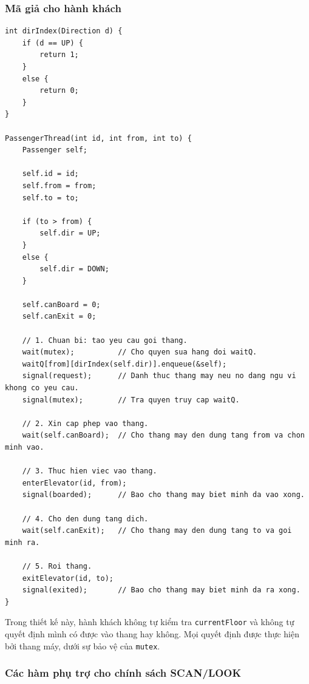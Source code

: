 \subsubsection*{Mã giả cho hành khách}

\begin{lstlisting}
int dirIndex(Direction d) {
    if (d == UP) {
        return 1;
    }
    else {
        return 0;
    }
}

PassengerThread(int id, int from, int to) {
    Passenger self;

    self.id = id;
    self.from = from;
    self.to = to;

    if (to > from) {
        self.dir = UP;
    }
    else {
        self.dir = DOWN;
    }

    self.canBoard = 0;
    self.canExit = 0;

    // 1. Chuan bi: tao yeu cau goi thang.
    wait(mutex);          // Cho quyen sua hang doi waitQ.
    waitQ[from][dirIndex(self.dir)].enqueue(&self);
    signal(request);      // Danh thuc thang may neu no dang ngu vi khong co yeu cau.
    signal(mutex);        // Tra quyen truy cap waitQ.

    // 2. Xin cap phep vao thang.
    wait(self.canBoard);  // Cho thang may den dung tang from va chon minh vao.

    // 3. Thuc hien viec vao thang.
    enterElevator(id, from);
    signal(boarded);      // Bao cho thang may biet minh da vao xong.

    // 4. Cho den dung tang dich.
    wait(self.canExit);   // Cho thang may den dung tang to va goi minh ra.

    // 5. Roi thang.
    exitElevator(id, to);
    signal(exited);       // Bao cho thang may biet minh da ra xong.
}
\end{lstlisting}

Trong thiết kế này, hành khách không tự kiểm tra
\texttt{currentFloor} và không tự quyết định mình có được vào thang hay
không. Mọi quyết định được thực hiện bởi thang máy, dưới sự bảo vệ của
\texttt{mutex}.

\subsubsection*{Các hàm phụ trợ cho chính sách SCAN/LOOK}


